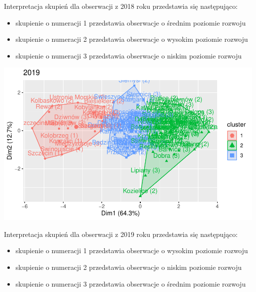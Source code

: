 \documentclass{amuthesis}
\begin{document}
Interpretacja skupień dla obserwacji z 2018 roku przedstawia się następująco:

\begin{itemize}
\tightlist
\item
  skupienie o numeracji 1 przedstawia obserwacje o średnim poziomie rozwoju
\item
  skupienie o numeracji 2 przedstawia obserwacje o wysokim poziomie rozwoju
\item
  skupienie o numeracji 3 przedstawia obserwacje o niskim poziomie rozwoju
\end{itemize}

\begin{Shaded}
\begin{Highlighting}[]
\OtherTok{\textless{}{-}} \SpecialCharTok{$} \NormalTok{, } \NormalTok{)}
\SpecialCharTok{::}\SpecialCharTok{+}\SpecialCharTok{::}\NormalTok{(}\NormalTok{)}
\end{Highlighting}
\end{Shaded}

\begin{center}\includegraphics[width=1.05\linewidth]{figures/unnamed-chunk-14-1} \end{center}

Interpretacja skupień dla obserwacji z 2019 roku przedstawia się następująco:

\begin{itemize}
\tightlist
\item
  skupienie o numeracji 1 przedstawia obserwacje o wysokim poziomie rozwoju
\item
  skupienie o numeracji 2 przedstawia obserwacje o niskim poziomie rozwoju
\item
  skupienie o numeracji 3 przedstawia obserwacje o średnim poziomie rozwoju
\end{itemize}
\end{document}
